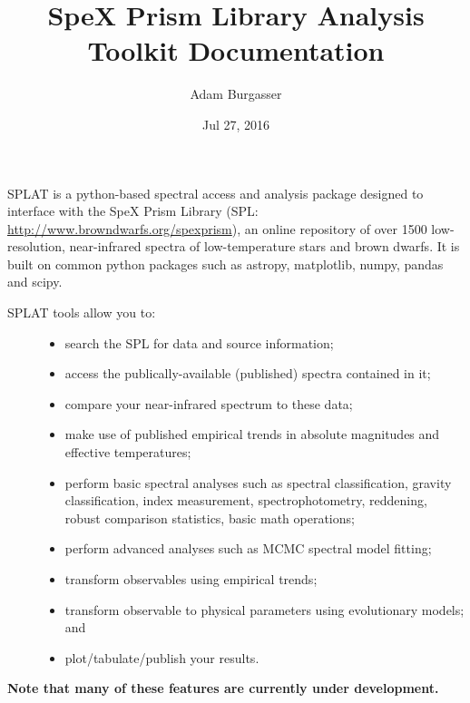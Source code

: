 \documentclass[letterpaper,10pt,english]{sphinxmanual}
\title{SpeX Prism Library Analysis Toolkit Documentation}
\date{Jul 27, 2016}
\author{Adam Burgasser}
\begin{document}
\maketitle
\tableofcontents
{}\label{index::doc}


SPLAT is a python-based spectral access and analysis package designed to interface
with the SpeX Prism Library (SPL: \url{http://www.browndwarfs.org/spexprism}),
an online repository of over
1500 low-resolution, near-infrared spectra of low-temperature stars and brown dwarfs.
It is built on common python packages such as astropy, matplotlib, numpy, pandas and scipy.
\begin{description}
\item[{SPLAT tools allow you to:}] \leavevmode\begin{itemize}
\item {} 
search the SPL for data and source information;

\item {} 
access the publically-available (published) spectra contained in it;

\item {} 
compare your near-infrared spectrum to these data;

\item {} 
make use of published empirical trends in absolute magnitudes and effective temperatures;

\item {} 
perform basic spectral analyses such as spectral classification, gravity classification, index measurement, spectrophotometry, reddening, robust comparison statistics, basic math operations;

\item {} 
perform advanced analyses such as MCMC spectral model fitting;

\item {} 
transform observables using empirical trends;

\item {} 
transform observable to physical parameters using evolutionary models; and

\item {} 
plot/tabulate/publish your results.

\end{itemize}

\end{description}

\textbf{Note that many of these features are currently under development.}
\end{document}
